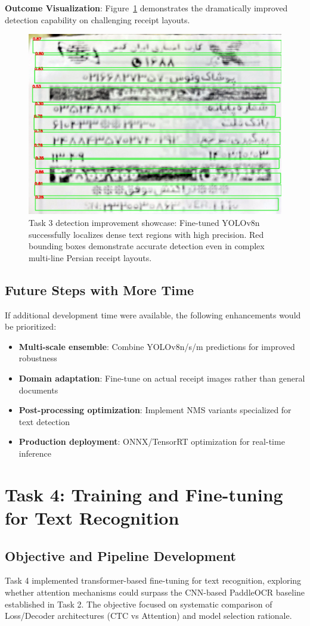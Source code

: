 \documentclass[11pt,a4paper]{article}
\begin{document}
\textbf{Outcome Visualization}: Figure~\ref{fig:task3-overlay} demonstrates the dramatically improved detection capability on challenging receipt layouts.

\begin{figure}[h]
  \centering
  \includegraphics[width=0.7\linewidth]{figures/task3_detection_overlay.jpg}
  \caption{Task 3 detection improvement showcase: Fine-tuned YOLOv8n successfully localizes dense text regions with high precision. Red bounding boxes demonstrate accurate detection even in complex multi-line Persian receipt layouts.}
  \label{fig:task3-overlay}
\end{figure}

\subsection{Future Steps with More Time}
If additional development time were available, the following enhancements would be prioritized:
\begin{itemize}
  \item \textbf{Multi-scale ensemble}: Combine YOLOv8n/s/m predictions for improved robustness
  \item \textbf{Domain adaptation}: Fine-tune on actual receipt images rather than general documents
  \item \textbf{Post-processing optimization}: Implement NMS variants specialized for text detection
  \item \textbf{Production deployment}: ONNX/TensorRT optimization for real-time inference
\end{itemize}
\section{Task 4: Training and Fine-tuning for Text Recognition}

\subsection{Objective and Pipeline Development}
Task 4 implemented transformer-based fine-tuning for text recognition, exploring whether attention mechanisms could surpass the CNN-based PaddleOCR baseline established in Task 2. The objective focused on systematic comparison of Loss/Decoder architectures (CTC vs Attention) and model selection rationale.
\end{document}
